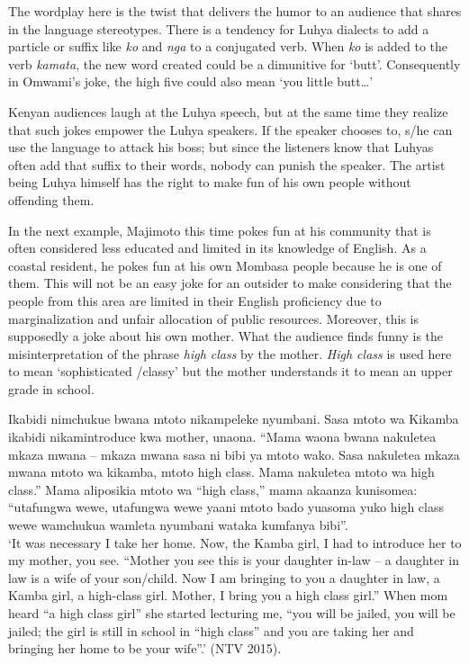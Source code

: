 \documentclass[output=paper]{langsci/langscibook}
\begin{document}
The wordplay here is the twist that delivers the humor to an audience that shares in the language stereotypes. There is a tendency for Luhya dialects to add a particle or suffix like \textit{ko} and \textit{nga} to a conjugated verb. When \textit{ko} is added to the verb \textit{kamata}, the new word created could be a dimunitive for ‘butt’. Consequently in Omwami’s joke, the high five could also mean ‘you little butt…’

Kenyan audiences laugh at the Luhya speech, but at the same time they realize that such jokes empower the Luhya speakers. If the speaker chooses to, s/he can use the language to attack his boss; but since the listeners know that Luhyas often add that suffix to their words, nobody can punish the speaker. The artist being Luhya himself has the right to make fun of his own people without offending them. 

In the next example, Majimoto this time pokes fun at his community that is often considered less educated and limited in its knowledge of English. As a coastal resident, he pokes fun at his own Mombasa people because he is one of them. This will not be an easy joke for an outsider to make considering that the people from this area are limited in their English proficiency due to marginalization and unfair allocation of public resources. Moreover, this is supposedly a joke about his own mother. What the audience finds funny is the misinterpretation of the phrase \textit{high class} by the mother. \textit{High class} is used here to mean ‘sophisticated /classy’ but the mother understands it to mean an upper grade in school. 

\ea
 Ikabidi nimchukue bwana mtoto nikampeleke nyumbani. Sasa mtoto wa Kikamba ikabidi nikamintroduce kwa mother, unaona. “Mama waona bwana nakuletea mkaza mwana – mkaza mwana sasa ni bibi ya mtoto wako. Sasa nakuletea mkaza mwana mtoto wa kikamba, mtoto high class. Mama nakuletea mtoto wa high class.” Mama aliposikia mtoto wa “high class,” mama akaanza kunisomea: “utafungwa wewe, utafungwa wewe yaani mtoto bado yuasoma yuko high class wewe wamchukua wamleta nyumbani wataka kumfanya bibi”.\\
\glt ‘It was necessary I take her home. Now, the Kamba girl, I had to introduce her to my mother, you see. “Mother you see this is your daughter in-law – a daughter in law is a wife of your son/child. Now I am bringing to you a daughter in law, a Kamba girl, a high-class girl. Mother, I bring you a high class girl.” When mom heard “a high class girl” she started lecturing me, “you will be jailed, you will be jailed; the girl is still in school in “high class” and you are taking her and bringing her home to be your wife”.’ (NTV 2015).
\z
\end{document}
